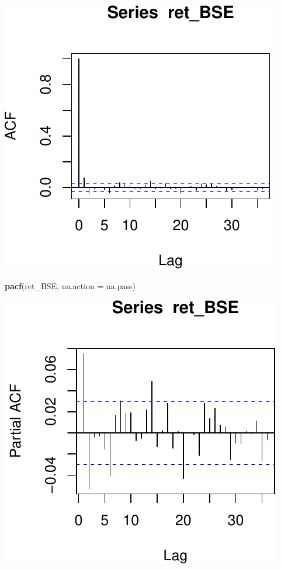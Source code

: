 \documentclass[11pt,]{article}
\newenvironment{Shaded}{\begin{snugshade}}{\end{snugshade}}
\newcommand{\KeywordTok}[1]{\textcolor[rgb]{0.13,0.29,0.53}{\textbf{#1}}}
\newcommand{\DataTypeTok}[1]{\textcolor[rgb]{0.13,0.29,0.53}{#1}}
\newcommand{\NormalTok}[1]{#1}
\begin{document}
\begin{center}\includegraphics{FMC_T4_PhD_ARMA_GARCH_files/figure-latex/BSE_fit_ARMA_GARCH-1} \end{center}

\begin{Shaded}
\begin{Highlighting}[]
\KeywordTok{pacf}\NormalTok{(ret_BSE, }\DataTypeTok{na.action =}\NormalTok{ na.pass)}
\end{Highlighting}
\end{Shaded}

\begin{center}\includegraphics{FMC_T4_PhD_ARMA_GARCH_files/figure-latex/BSE_fit_ARMA_GARCH-2} \end{center}
\end{document}

